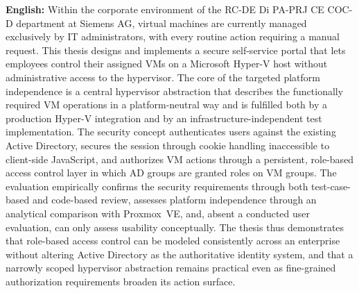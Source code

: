 \documentclass[12pt,a4paper]{article}
\begin{document}
\vspace{1em}
\noindent\textbf{English:}
Within the corporate environment of the RC-DE Di PA-PRJ CE COC-D department at Siemens AG, virtual machines are currently managed exclusively by IT administrators, with every routine action requiring a manual request. This thesis designs and implements a secure self-service portal that lets employees control their assigned VMs on a Microsoft Hyper-V host without administrative access to the hypervisor. The core of the targeted platform independence is a central hypervisor abstraction that describes the functionally required VM operations in a platform-neutral way and is fulfilled both by a production Hyper-V integration and by an infrastructure-independent test implementation. The security concept authenticates users against the existing Active Directory, secures the session through cookie handling inaccessible to client-side JavaScript, and authorizes VM actions through a persistent, role-based access control layer in which AD groups are granted roles on VM groups. The evaluation empirically confirms the security requirements through both test-case-based and code-based review, assesses platform independence through an analytical comparison with Proxmox~VE, and, absent a conducted user evaluation, can only assess usability conceptually. The thesis thus demonstrates that role-based access control can be modeled consistently across an enterprise without altering Active Directory as the authoritative identity system, and that a narrowly scoped hypervisor abstraction remains practical even as fine-grained authorization requirements broaden its action surface.

\newpage

\tableofcontents
\clearpage

\end{document}
